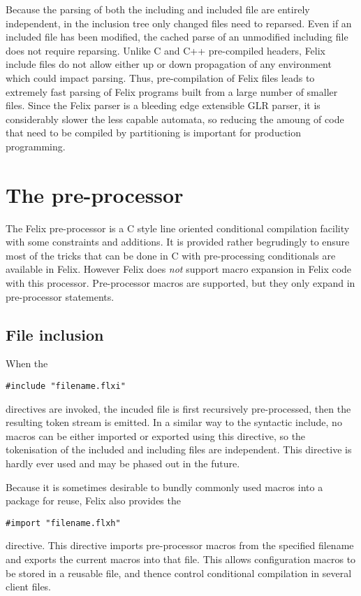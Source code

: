 \documentclass{report}
\begin{document}
Because the parsing of both the including and included file are
entirely independent, in the inclusion tree only changed files
need to reparsed. Even if an included file has been
modified, the cached parse of an unmodified including file
does not require reparsing. Unlike C and C++ pre-compiled headers,
Felix include files do not allow either up or down propagation
of any environment which could impact parsing. Thus, pre-compilation
of Felix files leads to extremely fast parsing of Felix programs
built from a large number of smaller files. Since the Felix parser
is a bleeding edge extensible GLR parser, it is considerably slower
the less capable automata, so reducing the amoung of code that
need to be compiled by partitioning is important for production
programming.

\section{The pre-processor}
The Felix pre-processor is a C style line oriented conditional
compilation facility with some constraints and additions.
It is provided rather begrudingly to ensure most of the tricks
that can be done in C with pre-processing conditionals are
available in Felix. However Felix does {\em not} support
macro expansion in Felix code with this processor.  
Pre-processor macros are supported, but they only expand
in pre-processor statements.

\subsection{File inclusion}
When the 
\begin{verbatim}
#include "filename.flxi"
\end{verbatim}
directives are invoked, the incuded file is first recursively pre-processed,
then the resulting token stream is emitted. In a similar way to
the syntactic include, no macros can be either imported or exported
using this directive, so the tokenisation of the included and including
files are independent. This directive is hardly ever used and may be phased
out in the future.

Because it is sometimes desirable to bundly commonly used macros into
a package for reuse, Felix also provides the
\begin{verbatim}
#import "filename.flxh"
\end{verbatim}
directive. This directive imports pre-processor macros from the specified filename
and exports the current macros into that file. This allows configuration 
macros to be stored in a reusable file, and thence control conditional
compilation in several client files.
\end{document}
